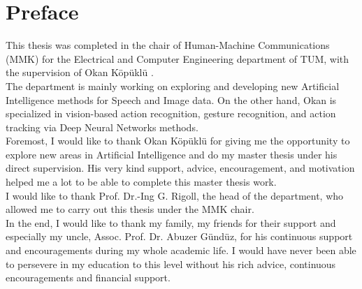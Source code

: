 \chapter*{Preface}

This thesis was completed in the chair of Human-Machine  Communications  (MMK) for the Electrical and Computer  Engineering department of TUM, with the supervision of Okan K\"op\"ukl\"u .\\

The department is mainly working on exploring and developing new Artificial Intelligence methods for Speech and Image data.   On the other hand,  Okan is specialized in vision-based action recognition, gesture recognition, and action tracking via Deep Neural Networks methods.\\

Foremost,  I would like to thank  Okan K\"op\"ukl\"u  for giving me the opportunity to explore new areas in Artificial Intelligence and do my master thesis under his direct supervision. His very kind support,  advice, encouragement, and motivation helped me a lot to be able to complete this master thesis work.\\

I would like to thank  Prof.  Dr.-Ing G. Rigoll, the head of the department, who allowed me to carry out this thesis under the MMK chair.\\

In the end, I would like to thank my family, my friends for their support and especially my uncle, Assoc. Prof.  Dr.  Abuzer G\"und\"uz, for his continuous support and encouragements during my whole academic life. I would have never been able to persevere in my education to this level without his rich advice, continuous encouragements and financial support. 